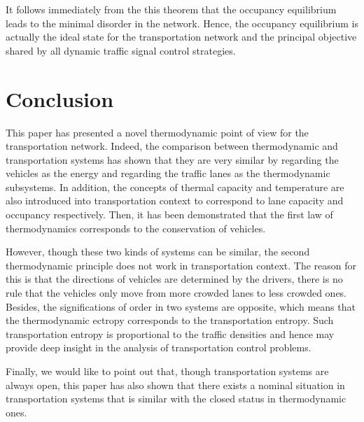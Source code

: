 \documentclass[preprint,authoryear,12pt]{elsarticle}
\begin{document}
It follows immediately from the this theorem that the occupancy
equilibrium leads to the minimal disorder in the network. Hence, the
occupancy equilibrium is actually the ideal state for the
transportation network and the principal objective shared by all
dynamic traffic signal control strategies.

\section{Conclusion}

This paper has presented a novel thermodynamic point of view for the
transportation network. Indeed, the comparison between thermodynamic
and transportation systems has shown that they are very similar by
regarding the vehicles as the energy and regarding the traffic lanes
as the thermodynamic subsystems. In addition, the concepts of thermal
capacity and temperature are also introduced into transportation
context to correspond to lane capacity and occupancy respectively.
Then, it has been demonstrated that the first law of thermodynamics
corresponds to the conservation of vehicles.

However, though these two kinds of systems can be similar, the second
thermodynamic principle does not work in transportation context. The
reason for this is that  the directions of vehicles are determined by
the drivers, there is no rule that the vehicles only move from more
crowded lanes to less crowded ones. Besides, the significations of
order in two systems are opposite, which means that the thermodynamic
ectropy corresponds to the transportation entropy. Such
transportation entropy is proportional to the traffic densities and
hence may provide deep insight in the analysis of transportation
control problems.

Finally, we would like to point out that, though transportation
systems are always open, this paper has also shown that there exists
a nominal situation in transportation systems that is similar with
the closed status in thermodynamic ones.



\end{document}
